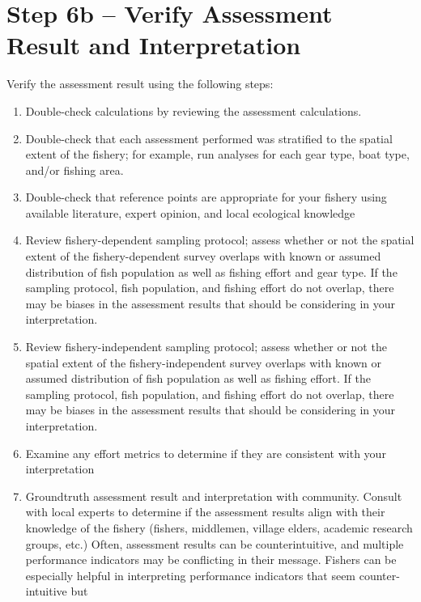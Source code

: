 \documentclass[]{book}
\begin{document}
\section{Step 6b -- Verify Assessment Result and
Interpretation}\label{step-6b-verify-assessment-result-and-interpretation}

Verify the assessment result using the following steps:

\begin{enumerate}
\def\labelenumi{\arabic{enumi}.}
\item
  Double-check calculations by reviewing the assessment calculations.
\item
  Double-check that each assessment performed was stratified to the
  spatial extent of the fishery; for example, run analyses for each gear
  type, boat type, and/or fishing area.
\item
  Double-check that reference points are appropriate for your fishery
  using available literature, expert opinion, and local ecological
  knowledge
\item
  Review fishery-dependent sampling protocol; assess whether or not the
  spatial extent of the fishery-dependent survey overlaps with known or
  assumed distribution of fish population as well as fishing effort and
  gear type. If the sampling protocol, fish population, and fishing
  effort do not overlap, there may be biases in the assessment results
  that should be considering in your interpretation.
\item
  Review fishery-independent sampling protocol; assess whether or not
  the spatial extent of the fishery-independent survey overlaps with
  known or assumed distribution of fish population as well as fishing
  effort. If the sampling protocol, fish population, and fishing effort
  do not overlap, there may be biases in the assessment results that
  should be considering in your interpretation.
\item
  Examine any effort metrics to determine if they are consistent with
  your interpretation
\item
  Groundtruth assessment result and interpretation with community.
  Consult with local experts to determine if the assessment results
  align with their knowledge of the fishery (fishers, middlemen, village
  elders, academic research groups, etc.) Often, assessment results can
  be counterintuitive, and multiple performance indicators may be
  conflicting in their message. Fishers can be especially helpful in
  interpreting performance indicators that seem counter-intuitive but

\end{enumerate}
\end{document}
